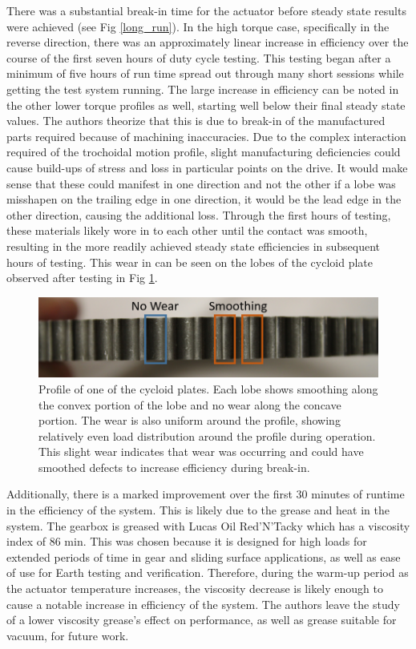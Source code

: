 There was a substantial break-in time for the actuator before steady state results were achieved (see Fig \ref{long_run}).
In the high torque case, specifically in the reverse direction, there was an approximately linear increase in efficiency over the course of the first seven hours of duty cycle testing.
This testing began after a minimum of five hours of run time spread out through many short sessions while getting the test system running.
The large increase in efficiency can be noted in the other lower torque profiles as well, starting well below their final steady state values.
The authors theorize that this is due to break-in of the manufactured parts required because of machining inaccuracies.
Due to the complex interaction required of the trochoidal motion profile, slight manufacturing deficiencies could cause build-ups of stress and loss in particular points on the drive.
It would make sense that these could manifest in one direction and not the other if a lobe was misshapen on the trailing edge in one direction, it would be the lead edge in the other direction, causing the additional loss.
Through the first hours of testing, these materials likely wore in to each other until the contact was smooth, resulting in the more readily achieved steady state efficiencies in subsequent hours of testing.
This wear in can be seen on the lobes of the cycloid plate observed after testing in Fig \ref{cycloid_plate}.

\begin{figure}[t]
	\centering
	\includegraphics[width=\linewidth]{images/wear}
	\caption{Profile of one of the cycloid plates. Each lobe shows smoothing along the convex portion of the lobe and no wear along the concave portion. The wear is also uniform around the profile, showing relatively even load distribution around the profile during operation. This slight wear indicates that wear was occurring and could have smoothed defects to increase efficiency during break-in.}
	\label{cycloid_plate}
\end{figure}

Additionally, there is a marked improvement over the first 30 minutes of runtime in the efficiency of the system.
This is likely due to the grease and heat in the system.
The gearbox is greased with Lucas Oil Red'N'Tacky which has a viscosity index of 86 min.
This was chosen because it is designed for high loads for extended periods of time in gear and sliding surface applications, as well as ease of use for Earth testing and verification.
Therefore, during the warm-up period as the actuator temperature increases, the viscosity decrease is likely enough to cause a notable increase in efficiency of the system.
The authors leave the study of a lower viscosity grease's effect on performance, as well as grease suitable for vacuum, for future work.

